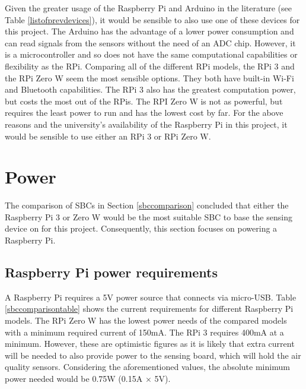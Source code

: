 \documentclass[11pt]{report}
\begin{document}
Given the greater usage of the Raspberry Pi and Arduino in the literature (see Table \ref{listofprevdevices}), it would be sensible to also use one of these devices for this project. The Arduino has the advantage of a lower power consumption and can read signals from the sensors without the need of an ADC chip. However, it is a microcontroller and so does not have the same computational capabilities or flexibility as the RPi. Comparing all of the different RPi models, the RPi 3 and the RPi Zero W seem the most sensible options. They both have built-in Wi-Fi and Bluetooth capabilities. The RPi 3 also has the greatest computation power, but costs the most out of the RPis. The RPI Zero W is not as powerful, but requires the least power to run and has the lowest cost by far. For the above reasons and the university's availability of the Raspberry Pi in this project, it would be sensible to use either an RPi 3 or RPi Zero W.



\section{Power} \label{power}

The comparison of SBCs in Section \ref{sbccomparison} concluded that either the Raspberry Pi 3 or Zero W would be the most suitable SBC to base the sensing device on for this project. Consequently, this section focuses on powering a Raspberry Pi.

\subsection{Raspberry Pi power requirements}


A Raspberry Pi requires a 5V power source that connects via micro-USB. Table \ref{sbccomparisontable} shows the current requirements for different Raspberry Pi models. The RPi Zero W has the lowest power needs of the compared models with a minimum required current of 150mA. The RPi 3 requires 400mA at a minimum. However, these are optimistic figures as it is likely that extra current will be needed to also provide power to the sensing board, which will hold the air quality sensors. Considering the aforementioned values, the absolute minimum power needed would be 0.75W (0.15A $\times$ 5V).
\end{document}
